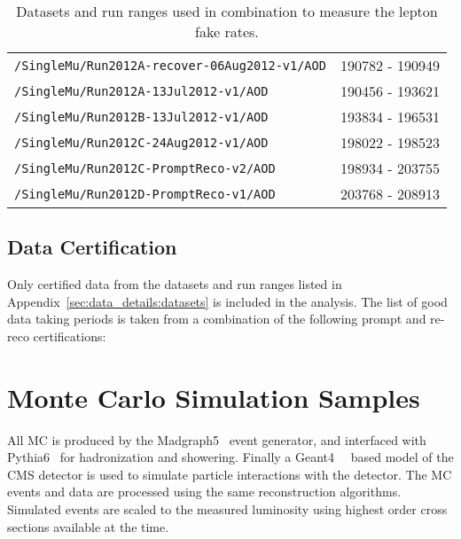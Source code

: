 \begin{table}[hbt]
\begin{center}
\begin{tabular}{lc}
\verb=/SingleMu/Run2012A-recover-06Aug2012-v1/AOD=                    &     190782 - 190949                  \\ 
\verb=/SingleMu/Run2012A-13Jul2012-v1/AOD=                                     &  190456 - 193621                     \\ 
\verb=/SingleMu/Run2012B-13Jul2012-v1/AOD=                                     &  193834 - 196531 \\ 
\verb=/SingleMu/Run2012C-24Aug2012-v1/AOD=                                   &   198022 - 198523                   \\ 
\verb=/SingleMu/Run2012C-PromptReco-v2/AOD=                                  &   198934 - 203755                    \\ 
\verb=/SingleMu/Run2012D-PromptReco-v1/AOD=                                  &  203768 - 208913   \\
 \hline\hline
\end{tabular}
\caption{\label{tab:FRDsets}Datasets and run ranges used in combination to measure the lepton fake rates.}
\end{center}
\end{table}

\subsection{Data Certification}
\label{sec:data_details:cert}

Only certified data from the datasets and run ranges listed in Appendix~\ref{sec:data_details:datasets} is included in the analysis.  The list of good data taking periods is taken from a combination of the following prompt and re-reco certifications:


\clearpage	
	
	
	
	
\section{Monte Carlo Simulation Samples}
\label{sec:MCSamples}

All MC is produced by the Madgraph5~\cite{Alwall:2011uj} event generator, and interfaced with Pythia6~\cite{pythia6} for hadronization and showering. Finally a Geant4~\cite{geant4applications}~\cite{geant4toolkit} based model of the CMS detector is used to simulate particle interactions with the detector. The MC events and data are processed using the same reconstruction algorithms. Simulated events are scaled to the measured luminosity using highest order cross sections available at the time.

